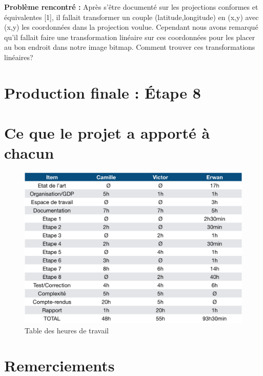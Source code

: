 \documentclass{article}
\begin{document}
\textbf{Problème rencontré :} \newline
Après s'être documenté sur les projections conformes et équivalentes [1], il fallait transformer un couple (latitude,longitude) en (x,y) avec (x,y) les coordonnées dans la projection voulue. Cependant nous avons remarqué qu'il fallait faire une transformation linéaire sur ces coordonnées pour les placer au bon endroit dans notre image bitmap. Comment trouver ces transformations linéaires?

\vspace{1\baselineskip}




 \section{ Production finale : Étape 8}


 \section{ Ce que le projet a apporté à chacun}


\begin{figure}[H]
    \centering
    \includegraphics[scale=0.5]{TableHeures.png}
    \caption{Table des heures de travail}
    \label{fig:tableheures}
\end{figure}


\section{ Remerciements}
\end{document}
